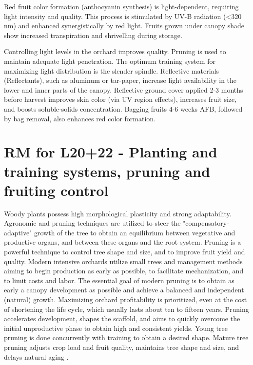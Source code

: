 \vspace{0.5em}
Red fruit color formation (anthocyanin synthesis) is light-dependent, requiring light intensity and quality. This process is stimulated by UV-B radiation (<320 nm) and enhanced synergistically by red light. Fruits grown under canopy shade show increased transpiration and shrivelling during storage.

\vspace{0.5em}
Controlling light levels in the orchard improves quality. Pruning is used to maintain adequate light penetration. The optimum training system for maximizing light distribution is the slender spindle. Reflective materials (Reflectants), such as aluminum or tar-paper, increase light availability in the lower and inner parts of the canopy. Reflective ground cover applied 2-3 months before harvest improves skin color (via UV region effects), increases fruit size, and boosts soluble-solids concentration. Bagging fruits 4-6 weeks AFB, followed by bag removal, also enhances red color formation.


\section{RM for L20+22 - Planting and training systems, pruning and fruiting control}

Woody plants possess high morphological plasticity and strong adaptability. Agronomic and pruning techniques are utilized to steer the "compensatory-adaptive" growth of the tree to obtain an equilibrium between vegetative and productive organs, and between these organs and the root system. Pruning is a powerful technique to control tree shape and size, and to improve fruit yield and quality. Modern intensive orchards utilize small trees and management methods aiming to begin production as early as possible, to facilitate mechanization, and to limit costs and labor. The essential goal of modern pruning is to obtain as early a canopy development as possible and achieve a balanced and independent (natural) growth. Maximizing orchard profitability is prioritized, even at the cost of shortening the life cycle, which usually lasts about ten to fifteen years. Pruning accelerates development, shapes the scaffold, and aims to quickly overcome the initial unproductive phase to obtain high and consistent yields. Young tree pruning is done concurrently with training to obtain a desired shape. Mature tree pruning adjusts crop load and fruit quality, maintains tree shape and size, and delays natural aging \cite*{rmb_03_L20+22_planting_training_systems_pruning_fruiting_control}.

